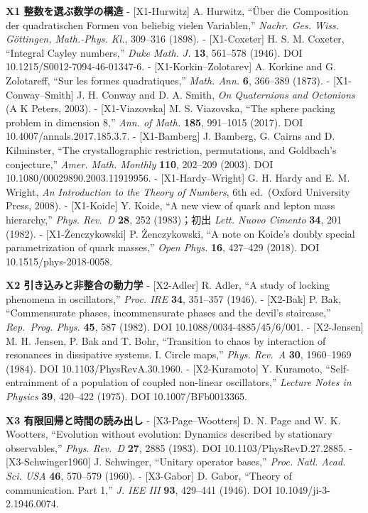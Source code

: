 \documentclass[
  a4paper,
]{ltjsarticle}
\begin{document}
\textbf{X1 整数を選ぶ数学の構造} - {[}X1-Hurwitz{]} A. Hurwitz, ``Über
die Composition der quadratischen Formen von beliebig vielen
Variablen,'' \emph{Nachr. Ges. Wiss. Göttingen, Math.-Phys. Kl.},
309--316 (1898). - {[}X1-Coxeter{]} H. S. M. Coxeter, ``Integral Cayley
numbers,'' \emph{Duke Math. J.} \textbf{13}, 561--578 (1946). DOI
10.1215/S0012-7094-46-01347-6. - {[}X1-Korkin--Zolotarev{]} A. Korkine
and G. Zolotareff, ``Sur les formes quadratiques,'' \emph{Math. Ann.}
\textbf{6}, 366--389 (1873). - {[}X1-Conway--Smith{]} J. H. Conway and
D. A. Smith, \emph{On Quaternions and Octonions} (A K Peters, 2003). -
{[}X1-Viazovska{]} M. S. Viazovska, ``The sphere packing problem in
dimension 8,'' \emph{Ann. of Math.} \textbf{185}, 991--1015 (2017). DOI
10.4007/annals.2017.185.3.7. - {[}X1-Bamberg{]} J. Bamberg, G. Cairns
and D. Kilminster, ``The crystallographic restriction, permutations, and
Goldbach's conjecture,'' \emph{Amer. Math. Monthly} \textbf{110},
202--209 (2003). DOI 10.1080/00029890.2003.11919956. -
{[}X1-Hardy--Wright{]} G. H. Hardy and E. M. Wright, \emph{An
Introduction to the Theory of Numbers}, 6th ed.~(Oxford University
Press, 2008). - {[}X1-Koide{]} Y. Koide, ``A new view of quark and
lepton mass hierarchy,'' \emph{Phys. Rev.~D} \textbf{28}, 252
(1983)；初出 \emph{Lett. Nuovo Cimento} \textbf{34}, 201 (1982). -
{[}X1-Żenczykowski{]} P. Żenczykowski, ``A note on Koide's doubly
special parametrization of quark masses,'' \emph{Open Phys.}
\textbf{16}, 427--429 (2018). DOI 10.1515/phys-2018-0058.

\textbf{X2 引き込みと非整合の動力学} - {[}X2-Adler{]} R. Adler, ``A
study of locking phenomena in oscillators,'' \emph{Proc. IRE}
\textbf{34}, 351--357 (1946). - {[}X2-Bak{]} P. Bak, ``Commensurate
phases, incommensurate phases and the devil's staircase,''
\emph{Rep.~Prog. Phys.} \textbf{45}, 587 (1982). DOI
10.1088/0034-4885/45/6/001. - {[}X2-Jensen{]} M. H. Jensen, P. Bak and
T. Bohr, ``Transition to chaos by interaction of resonances in
dissipative systems. I. Circle maps,'' \emph{Phys. Rev.~A} \textbf{30},
1960--1969 (1984). DOI 10.1103/PhysRevA.30.1960. - {[}X2-Kuramoto{]} Y.
Kuramoto, ``Self-entrainment of a population of coupled non-linear
oscillators,'' \emph{Lecture Notes in Physics} \textbf{39}, 420--422
(1975). DOI 10.1007/BFb0013365.

\textbf{X3 有限回帰と時間の読み出し} - {[}X3-Page--Wootters{]} D. N.
Page and W. K. Wootters, ``Evolution without evolution: Dynamics
described by stationary observables,'' \emph{Phys. Rev.~D} \textbf{27},
2885 (1983). DOI 10.1103/PhysRevD.27.2885. - {[}X3-Schwinger1960{]} J.
Schwinger, ``Unitary operator bases,'' \emph{Proc. Natl. Acad. Sci. USA}
\textbf{46}, 570--579 (1960). - {[}X3-Gabor{]} D. Gabor, ``Theory of
communication. Part 1,'' \emph{J. IEE III} \textbf{93}, 429--441 (1946).
DOI 10.1049/ji-3-2.1946.0074.
\end{document}
